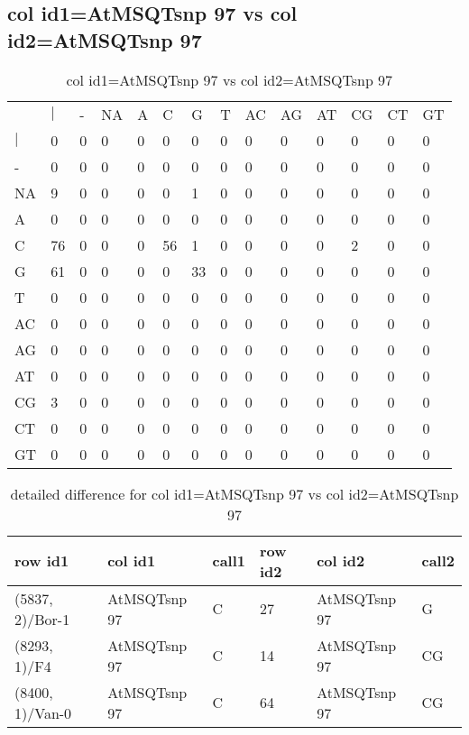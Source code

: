 \subsection{col id1=AtMSQTsnp 97 vs col id2=AtMSQTsnp 97}
\begin{center}
\begin{longtable}{|l|l|l|l|l|l|l|l|l|l|l|l|l|l|}
\caption{col id1=AtMSQTsnp 97 vs col id2=AtMSQTsnp 97} \label{table_dm782}\\
\hline
\\
\hline
&$|$&-&NA&A&C&G&T&AC&AG&AT&CG&CT&GT\\
$|$&0&0&0&0&0&0&0&0&0&0&0&0&0\\
-&0&0&0&0&0&0&0&0&0&0&0&0&0\\
NA&9&0&0&0&0&1&0&0&0&0&0&0&0\\
A&0&0&0&0&0&0&0&0&0&0&0&0&0\\
C&76&0&0&0&56&1&0&0&0&0&2&0&0\\
G&61&0&0&0&0&33&0&0&0&0&0&0&0\\
T&0&0&0&0&0&0&0&0&0&0&0&0&0\\
AC&0&0&0&0&0&0&0&0&0&0&0&0&0\\
AG&0&0&0&0&0&0&0&0&0&0&0&0&0\\
AT&0&0&0&0&0&0&0&0&0&0&0&0&0\\
CG&3&0&0&0&0&0&0&0&0&0&0&0&0\\
CT&0&0&0&0&0&0&0&0&0&0&0&0&0\\
GT&0&0&0&0&0&0&0&0&0&0&0&0&0\\
\hline
\end{longtable}
\end{center}

\begin{center}
\begin{longtable}{|l|l|l|l|l|l|}
\caption{detailed difference for col id1=AtMSQTsnp 97 vs col id2=AtMSQTsnp 97} \label{table_dm783}\\
\hline
row id1&col id1&call1&row id2&col id2&call2\\
\hline
(5837, 2)/Bor-1&AtMSQTsnp 97&C&27&AtMSQTsnp 97&G\\
(8293, 1)/F4&AtMSQTsnp 97&C&14&AtMSQTsnp 97&CG\\
(8400, 1)/Van-0&AtMSQTsnp 97&C&64&AtMSQTsnp 97&CG\\
\hline
\end{longtable}
\end{center}

